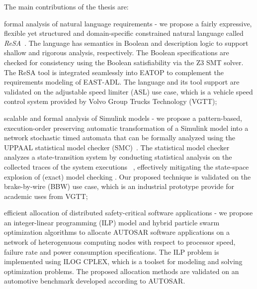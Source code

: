 The main contributions of the thesis are: 
\begin{enumerate*}[label=(\roman*)]
\item formal analysis of natural language requirements - we propose a fairly expressive, flexible yet structured and domain-specific constrained natural language called \textit{ReSA}~\cite{resatool}\cite{Mahmud2015ReSA:Systems}. The language has semantics in Boolean and description logic to support shallow and rigorous analysis, respectively. The Boolean specifications are checked for consistency using the Boolean satisfiability via the Z3 SMT solver.  The ReSA tool is integrated seamlessly into EATOP to complement the requirements modeling of EAST-ADL. The language and its tool support are validated on the adjustable speed limiter (ASL) use case, which is a vehicle speed control system provided by Volvo Group Trucks Technology (VGTT);

\item scalable and formal analysis of Simulink models - we propose a pattern-based, execution-order preserving automatic transformation of a Simulink model into a network stochastic timed automata that can be formally analyzed using the UPPAAL statistical model checker (SMC)~\cite{Filipovikj2016SimulinkSystems}. The statistical model checker analyzes a state-transition system by conducting statistical analysis on the collected traces of the system executions~ \cite{Bulychev2012UPPAAL-SMC:Automata}, effectively mitigating the state-space explosion of (exact) model checking \cite{Legay2010StatisticalOverview}. Our proposed technique is validated on the brake-by-wire (BBW) use case, which is an industrial prototype provide for academic uses from VGTT;

\item efficient allocation of distributed safety-critical software applications - we propose an integer-linear programming (ILP) model and hybrid particle swarm optimization algorithms to allocate AUTOSAR software applications on a network of heterogenuous computing nodes with respect to processor speed, failure rate and power consumption specifications. The  ILP problem is implemented using ILOG CPLEX, which is a toolset for modeling and solving optimization problems. The proposed allocation methods are validated on an automotive benchmark developed according to AUTOSAR.
\end{enumerate*}



